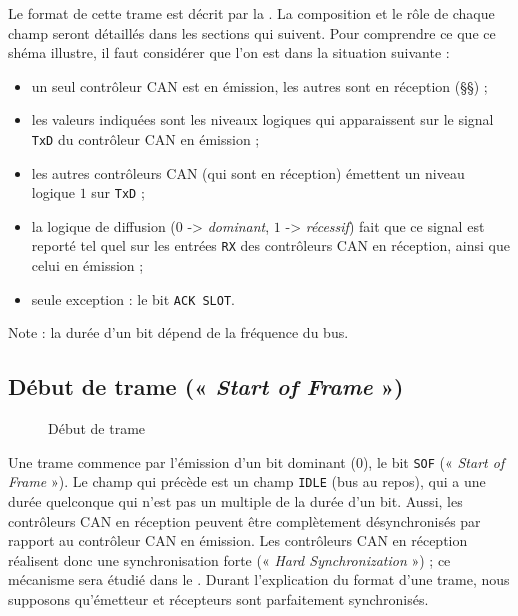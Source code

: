 Le format de cette trame est décrit par la . La composition et le rôle de chaque champ seront détaillés dans les sections qui suivent. Pour comprendre ce que ce shéma illustre, il faut considérer que l'on est dans la situation suivante :
\begin{itemize}
  \item un seul contrôleur CAN est en émission, les autres sont en réception (§§) ;
  \item les valeurs indiquées sont les niveaux logiques qui apparaissent sur le signal \texttt{TxD} du contrôleur CAN en émission ;
  \item les autres contrôleurs CAN (qui sont en réception) émettent un niveau logique $1$ sur \texttt{TxD} ;
  \item la logique de diffusion ($0$ -> \emph{dominant}, $1$ -> \emph{récessif}) fait que ce signal est reporté tel quel sur les entrées \texttt{RX} des contrôleurs CAN en réception, ainsi que celui en émission ;
  \item seule exception : le bit \texttt{ACK SLOT}. 
\end{itemize}

Note : la durée d'un bit dépend de la fréquence du bus.









\subsection{Début de trame (« \emph{Start of Frame} »)}

\begin{figure}[h]
  \centering
  \caption{Début de trame}
\end{figure}

Une trame commence par l'émission d'un bit dominant ($0$), le bit \texttt{SOF} (« \emph{Start of Frame} »). Le champ qui précède est un champ \texttt{IDLE} (bus au repos), qui a une durée quelconque qui n'est pas un multiple de la durée d'un bit. Aussi, les contrôleurs CAN en réception peuvent être complètement désynchronisés par rapport au contrôleur CAN en émission. Les contrôleurs CAN en réception réalisent donc une synchronisation forte (« \emph{Hard Synchronization} ») ; ce mécanisme sera étudié dans le . Durant l'explication du format d'une trame, nous supposons qu'émetteur et récepteurs sont parfaitement synchronisés.










